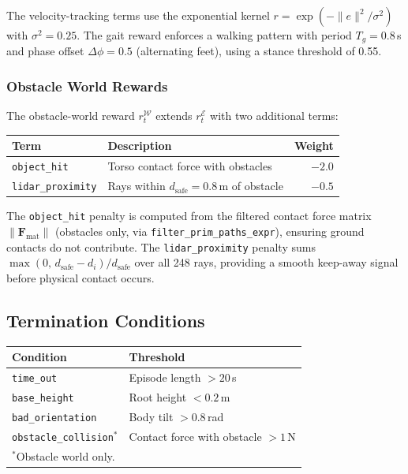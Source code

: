 \documentclass{article}
\begin{document}
The velocity-tracking terms use the exponential kernel
$r = \exp(-\|e\|^2 / \sigma^2)$ with $\sigma^2 = 0.25$.
The gait reward enforces a walking pattern with period $T_g = 0.8$\,s and
phase offset $\Delta\phi = 0.5$ (alternating feet), using a stance threshold
of 0.55.

\subsubsection{Obstacle World Rewards}

The obstacle-world reward $r_t^\mathcal{W}$ extends $r_t^\mathcal{E}$ with
two additional terms:

\begin{center}
\begin{tabular}{llr}
  \toprule
  \textbf{Term} & \textbf{Description} & \textbf{Weight} \\
  \midrule
  \texttt{object\_hit} & Torso contact force with obstacles & $-2.0$ \\
  \texttt{lidar\_proximity} & Rays within $d_\text{safe}{=}0.8$\,m of obstacle & $-0.5$ \\
  \bottomrule
\end{tabular}
\end{center}

The \texttt{object\_hit} penalty is computed from the filtered contact force
matrix $\|\mathbf{F}_\text{mat}\|$ (obstacles only, via
\texttt{filter\_prim\_paths\_expr}), ensuring ground contacts do not
contribute.
The \texttt{lidar\_proximity} penalty sums
$\max(0,\, d_\text{safe} - d_i) / d_\text{safe}$ over all 248 rays,
providing a smooth keep-away signal before physical contact occurs.

\subsection{Termination Conditions}

\begin{center}
\begin{tabular}{ll}
  \toprule
  \textbf{Condition} & \textbf{Threshold} \\
  \midrule
  \texttt{time\_out} & Episode length $> 20$\,s \\
  \texttt{base\_height} & Root height $< 0.2$\,m \\
  \texttt{bad\_orientation} & Body tilt $> 0.8$\,rad \\
  \texttt{obstacle\_collision}$^*$ & Contact force with obstacle $> 1$\,N \\
  \bottomrule
  \multicolumn{2}{l}{$^*$Obstacle world only.}
\end{tabular}
\end{center}
\end{document}
